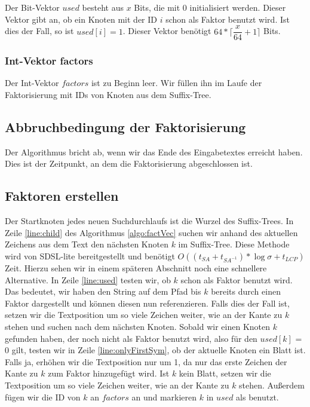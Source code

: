 \documentclass[a4paper,11pt]{scrartcl}%
\theoremstyle{change}
\theoremstyle{nonumberplain}
\theoremstyle{change}
\theoremstyle{nonumberplain}
\theoremstyle{change}
\theoremstyle{nonumberplain}
\begin{document}
Der Bit-Vektor $used$ besteht aus $x$ Bits, die mit 0 initialisiert werden. Dieser Vektor gibt an, ob ein Knoten mit der ID $i$ schon als Faktor benutzt wird.
Ist dies der Fall, so ist $used[i]=1$. Dieser Vektor benötigt $64*\lceil\dfrac{x}{64}+1\rceil$ Bits.\cite{sdsl}

\subsubsection{Int-Vektor factors}\label{vektor_factors}

Der Int-Vektor $factors$ ist zu Beginn leer. Wir füllen ihn im Laufe der Faktorisierung mit IDs von Knoten aus dem Suffix-Tree.  

\subsection{Abbruchbedingung der Faktorisierung}

Der Algorithmus bricht ab, wenn wir das Ende des Eingabetextes erreicht haben. Dies ist der Zeitpunkt, an dem die Faktorisierung abgeschlossen ist.

\subsection{Faktoren erstellen}

Der Startknoten jedes neuen Suchdurchlaufs ist die Wurzel des Suffix-Trees.
In Zeile \ref{line:child} des Algorithmus \ref{algo:factVec}  suchen wir anhand des aktuellen Zeichens aus dem Text den nächsten Knoten $k$ im Suffix-Tree. Diese Methode wird von SDSL-lite bereitgestellt und benötigt $O((t_{SA}+t_{SA^{-1}}) * \log \sigma + t_{LCP})$ Zeit. Hierzu sehen wir in einem späteren Abschnitt noch eine schnellere Alternative. In Zeile \ref{line:used} testen wir, ob $k$ schon als Faktor benutzt wird. Das bedeutet, wir haben den String  auf dem Pfad bis $k$ bereits durch einen Faktor dargestellt und können diesen nun referenzieren. Falls dies der Fall ist, setzen wir die Textposition um so viele Zeichen weiter, wie an der Kante zu $k$ stehen und suchen nach dem nächsten Knoten. Sobald wir einen Knoten $k$ gefunden haben, der noch nicht als Faktor benutzt wird, also für den $used[k]$ = 0 gilt, testen wir in Zeile \ref{line:onlyFirstSym}, ob der aktuelle Knoten ein Blatt ist. Falls ja, erhöhen wir die Textposition nur um 1, da nur das erste Zeichen der Kante zu $k$ zum Faktor hinzugefügt wird. Ist $k$ kein Blatt, setzen wir die Textposition um so viele Zeichen weiter, wie an der Kante zu $k$ stehen. Außerdem fügen wir die ID von $k$ an $factors$ an und markieren $k$ in $used$ als benutzt.
\end{document}
